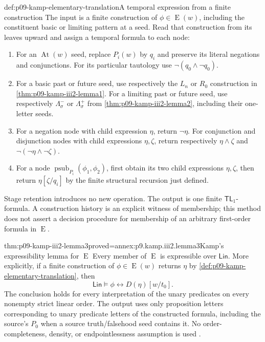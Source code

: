 \begin{hbmethod}{def:p09-kamp-elementary-translation}{A temporal expression from a finite construction}
The input is a finite construction of \(\phi\in\operatorname{E}(w)\),
including the constituent basic or limiting pattern at a seed. Read that
construction from its leaves upward and assign a temporal formula to each
node:
\begin{enumerate}
\item For an \(\operatorname{At}(w)\) seed, replace \(P_i(w)\) by
      \(q_i\) and preserve its literal negations and conjunctions.
      For its particular tautology use
      \(\neg(q_0\land\neg q_0)\).
\item For a basic past or future seed, use respectively the \(L_n\) or
      \(R_0\) construction in \cref{thm:p09-kamp-iii2-lemma1}.
      For a limiting past or future seed, use respectively
      \(\Lambda^-_\sigma\) or \(\Lambda^+_\sigma\) from
      \cref{thm:p09-kamp-iii2-lemma2}, including their one-letter seeds.
\item For a negation node with child expression \(\eta\), return
      \(\neg\eta\). For conjunction and disjunction nodes with child
      expressions \(\eta,\zeta\), return respectively
      \(\eta\land\zeta\) and
      \(\neg(\neg\eta\land\neg\zeta)\).
\item For a node \(\operatorname{psub}_{P_i}(\phi_1,\phi_2)\),
      first obtain its two child expressions \(\eta,\zeta\), then
      return \(\eta[\zeta/q_i]\) by the finite structural recursion
      just defined.
\end{enumerate}
Stage retention introduces no new operation. The output is one finite
\(\mathsf{TL}_1\)-formula. A construction history is an explicit witness
of membership; this method does not assert a decision procedure for
membership of an arbitrary first-order formula in \(\operatorname{E}\).
\end{hbmethod}

\begin{hblemma}{thm:p09-kamp-iii2-lemma3}{proved=annex:p9.kamp.iii2.lemma3}{Kamp's expressibility lemma for \(\operatorname{E}\)}
Every member of \(\operatorname{E}\) is expressible over
\(\mathsf{Lin}\). More explicitly, if a finite construction of
\(\phi\in\operatorname{E}(w)\) returns \(\eta\) by
\cref{def:p09-kamp-elementary-translation}, then
\[
             \mathsf{Lin}\models
                  \phi\longleftrightarrow D(\eta)[w/t_0].
\]
The conclusion holds for every interpretation of the unary predicates
on every nonempty strict linear order. The output uses only proposition
letters corresponding to unary predicate letters of the constructed
formula, including the source's \(P_0\) when a source truth/falsehood
seed contains it. No order-completeness, density, or endpointlessness
assumption is used \cite[ch.~III, lemma~3, p.~73]{Kamp1968}.
\end{hblemma}

